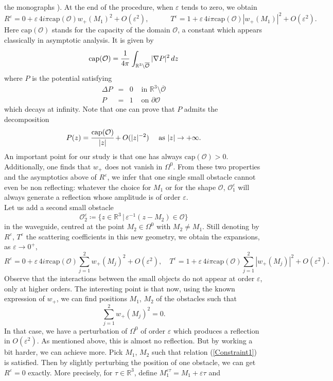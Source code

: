 \documentclass[11pt,a4paper]{report}
\newcommand{\eps}{\varepsilon}
\newcommand{\Om}{\Omega}
\newcommand{\mrm}[1]{\mathrm{#1}}
\newcommand{\R}{\mathbb{R}}
\begin{document}
the monographs \cite{Ilin,MaNP00}). At the end of the procedure, when $\eps$ tends to zero, we obtain
\[
R^\eps=0+\eps\,4i\pi\mrm{cap}(\mathcal{O})w_+(M_1)^2+O(\eps^2),\qquad\quad T^\eps=1+\eps\,4i\pi\mrm{cap}(\mathcal{O})|w_+(M_1)|^2+O(\eps^2).
\]
Here $\mrm{cap}(\mathcal{O})$ stands for the capacity of the domain $\mathcal{O}$, a constant which appears classically in asymptotic analysis. It is given by 
\[
\mrm{cap}(\mathcal{O})=\cfrac{1}{4\pi}\,\int_{\R^3\setminus\overline{\mathcal{O}}}|\nabla P|^2\,dz
\]
where $P$ is the potential satisfying
\[
\begin{array}{|rcll}
\Delta P&=&0&\mbox{ in }\R^3\setminus\overline{\mathcal{O}} \\[3pt]
P&=&1 & \mbox{ on }\partial\mathcal{O}
\end{array}
\]
which decays at infinity. Note that one can prove that $P$ admits the decomposition
\[
P(z)=\cfrac{\mrm{cap}(\mathcal{O})}{|z|}+O(|z|^{-2})\quad\mbox{ as }|z|\to+\infty.
\]
An important point for our study is that one has always $\mrm{cap}(\mathcal{O})>0$. Additionally, one finds that $w_+$ does not vanish in $\Om^0$. From these two properties and the asymptotics above of $R^\eps$, we infer that one single small obstacle cannot even be non reflecting: whatever the choice for $M_1$ or for the shape $\mathcal{O}$, $\mathcal{O}^\eps_1$ will always generate a reflection whose amplitude is of order $\eps$.\\
\newline
Let us add a second small obstacle 
\[
\mathcal{O}^\eps_2\coloneqq\{z\in\R^3\,|\,\eps^{-1}(z-M_2)\in\mathcal{O}\}
\]
in the waveguide, centred at the point $M_2\in\Om^0$ with $M_2\ne M_1$. Still denoting by $R^\eps$, $T^\eps$ the scattering coefficients in this new geometry, we obtain the expansions, as $\eps\to0^+$,
\begin{equation}\label{AsyExpansionsFlies}
R^\eps=0+\eps\,4i\pi\mrm{cap}(\mathcal{O})\sum_{j=1}^2w_+(M_j)^2+O(\eps^2),\quad T^\eps=1+\eps\,4i\pi\mrm{cap}(\mathcal{O})\sum_{j=1}^2|w_+(M_j)|^2+O(\eps^2).
\end{equation}
Observe that the interactions between the small objects do not appear at order $\eps$, only at higher orders. The interesting point is that now, using the known expression of $w_+$, we can find positions $M_1$, $M_2$ of the obstacles such that
\begin{equation}\label{Constraint1}
\sum_{j=1}^2w_+(M_j)^2=0.
\end{equation}
In that case, we have a perturbation of $\Om^0$ of order $\eps$ which produces a reflection in $O(\eps^2)$. As mentioned above, this is almost no reflection. But by working a bit harder, we can achieve more. Pick $M_1$, $M_2$ such that relation (\ref{Constraint1}) is satisfied. Then by slightly perturbing the position of one obstacle, we can get $R^\eps=0$ exactly. More precisely, for $\tau\in\R^3$, define $M^{\eps\tau}_1=M_1+\eps\tau$ and 
\end{document}
